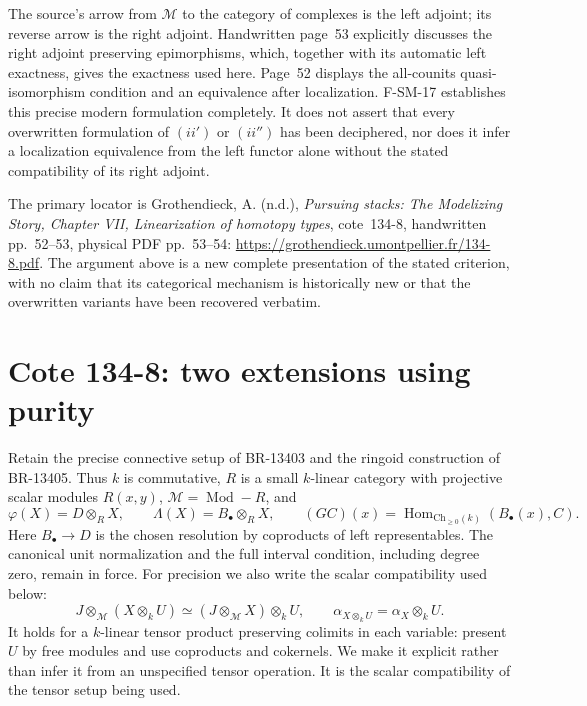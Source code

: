 \documentclass[11pt,a4paper]{article}
\theoremstyle{definition}\newtheorem{definition}[theorem]{Definition}
\theoremstyle{remark}\newtheorem{remark}[theorem]{Remark}
\begin{document}
The source's arrow from $\mathcal M$ to the category of complexes is
the left adjoint; its reverse arrow is the right adjoint.
Handwritten page~53 explicitly discusses the right adjoint preserving
epimorphisms, which, together with its automatic left exactness,
gives the exactness used here.  Page~52 displays the all-counits
quasi-isomorphism condition and an equivalence after localization.
F-SM-17 establishes this precise modern formulation completely.
It does not assert that every overwritten formulation of
$(ii')$ or $(ii'')$ has been deciphered, nor does it infer a localization
equivalence from the left functor alone without the stated compatibility
of its right adjoint.

The primary locator is Grothendieck, A. (n.d.),
\emph{Pursuing stacks: The Modelizing Story, Chapter VII,
Linearization of homotopy types}, cote~134-8, handwritten
pp.~52--53, physical PDF pp.~53--54:
\url{https://grothendieck.umontpellier.fr/134-8.pdf}.
The argument above is a new complete presentation of the stated
criterion, with no claim that its categorical mechanism is historically
new or that the overwritten variants have been recovered verbatim.


\section{Cote 134-8: two extensions using purity}
\label{sec:SM-cote1348-purity}

Retain the precise connective setup of BR-13403 and the ringoid
construction of BR-13405. Thus $k$ is commutative,
$R$ is a small $k$-linear category with projective scalar modules
$R(x,y)$, $\mathcal M=\operatorname{Mod}\!-\!R$, and
\[
 \varphi(X)=D\otimes_R X,\qquad
 \Lambda(X)=B_\bullet\otimes_R X,\qquad
 (GC)(x)=\operatorname{Hom}_{\mathrm{Ch}_{\geq0}(k)}(B_\bullet(x),C).
 \tag{SM24.1}
\]
Here $B_\bullet\to D$ is the chosen resolution by coproducts of
left representables. The canonical unit normalization and the full
interval condition, including degree zero, remain in force.
For precision we also write the scalar compatibility used below:
\[
 J\otimes_{\mathcal M}(X\otimes_k U)
   \simeq (J\otimes_{\mathcal M}X)\otimes_k U,\qquad
 \alpha_{X\otimes_k U}=\alpha_X\otimes_k U.
 \tag{SM24.2}
\]
It holds for a $k$-linear tensor product preserving colimits in each
variable: present $U$ by free modules and use coproducts and cokernels.
We make it explicit rather than infer it from an unspecified tensor
operation. It is the scalar compatibility of the tensor setup being
used.
\end{document}
